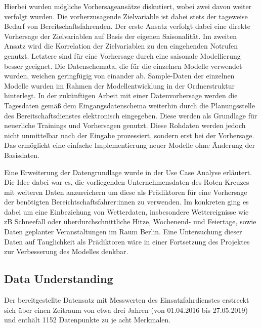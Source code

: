 Hierbei wurden mögliche Vorhersageansätze diskutiert, wobei zwei davon weiter verfolgt wurden. Die vorherzusagende Zielvariable ist dabei stets der tageweise Bedarf von Bereitschaftsfahrenden. Der erste Ansatz verfolgt dabei eine direkte Vorhersage der Zielvariablen auf Basis der eigenen Saisonalität. Im zweiten Ansatz wird die Korrelation der Zielvariablen zu den eingehenden Notrufen genutzt. Letztere sind für eine Vorhersage durch eine saisonale Modellierung besser geeignet. Die Datenschemata, die für die einzelnen Modelle verwendet wurden, weichen geringfügig von einander ab. Sample-Daten der einzelnen Modelle wurden im Rahmen der Modellentwicklung in der Ordnerstruktur hinterlegt. In der zukünftigen Arbeit mit einer Datenvorhersage werden die Tagesdaten gemäß dem Eingangsdatenschema weiterhin durch die Planungsstelle des Bereitschaftsdienstes elektronisch eingegeben. Diese werden als Grundlage für neuerliche Trainings und Vorhersagen genutzt. Diese Rohdaten werden jedoch nicht unmittelbar nach der Eingabe prozessiert, sondern erst bei der Vorhersage. Das ermöglicht eine einfache Implementierung neuer Modelle ohne Änderung der Basisdaten.

Eine Erweiterung der Datengrundlage wurde in der Use Case Analyse erläutert. Die Idee dabei war es, die vorliegenden Unternehmensdaten des Roten Kreuzes mit weiteren Daten anzureichern um diese als Prädiktoren für eine Vorhersage der benötigten Bereichtschaftsfahrer:innen zu verwenden. Im konkreten ging es dabei um eine Einbeziehung von Wetterdaten, insbesondere Wettereignisse wie zB Schneefall oder überdurchschnittliche Hitze, Wochenend- und Feiertage, sowie Daten geplanter Veranstaltungen im Raum Berlin. Eine Untersuchung dieser Daten auf Tauglichkeit als Prädiktoren wäre in einer Fortsetzung des Projektes zur Verbesserung des Modelles denkbar.


\subsection{Data Understanding}
\label{du}

Der bereitgestellte Datensatz mit Messwerten des Einsatzfahrdienstes erstreckt sich über einen Zeitraum von etwa drei Jahren (von 01.04.2016 bis 27.05.2019) und enthält 1152 Datenpunkte zu je acht Merkmalen.



